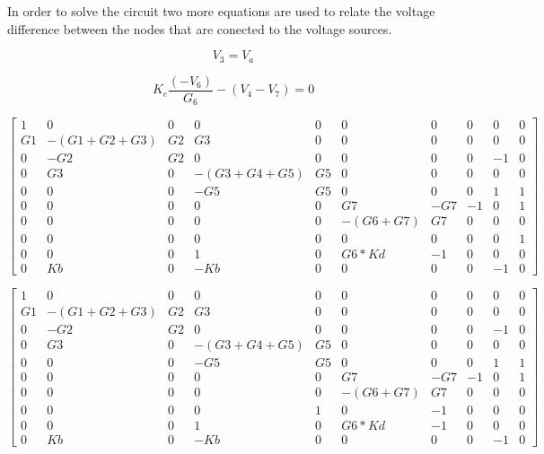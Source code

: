In order to solve the circuit two more equations are used to relate the voltage difference between the nodes that 
are conected to the voltage sources.

\begin{equation}
	V_3 = V_a
	\label{}
\end{equation}

\begin{equation}
	K_c\frac{(-V_6)}{G_6}-(V_4-V_7)=0
	\label{}
\end{equation}

$ \begin{bmatrix}
1 & 0 & 0 & 0 & 0 & 0 & 0 & 0 & 0 & 0 \\
G1 & -(G1+G2+G3) & G2 & G3 & 0 & 0 & 0 & 0 & 0 & 0 \\
0 & -G2 & G2 & 0 & 0 & 0 & 0 & 0 & -1 & 0 \\
0 & G3 & 0 & -(G3+G4+G5) & G5 & 0 & 0 & 0 & 0 & 0 \\
0 & 0 & 0 & -G5 & G5 & 0 & 0 & 0 & 1 & 1 \\
0 & 0 & 0 & 0 & 0 & G7 & -G7 & -1 & 0 & 1 \\
0 & 0 & 0 & 0 & 0 & -(G6+G7) & G7 & 0 & 0 & 0 \\
0 & 0 & 0 & 0 & 0 & 0 & 0 & 0 & 0 & 1 \\
0 & 0 & 0 & 1 & 0 & G6*Kd & -1 & 0 & 0 & 0 \\
0 & Kb & 0 & -Kb & 0 & 0 & 0 & 0 & -1 & 0 
\end{bmatrix}  $

$ \begin{bmatrix}
1 & 0 & 0 & 0 & 0 & 0 & 0 & 0 & 0 & 0 \\
G1 & -(G1+G2+G3) & G2 & G3 & 0 & 0 & 0 & 0 & 0 & 0 \\
0 & -G2 & G2 & 0 & 0 & 0 & 0 & 0 & -1 & 0 \\
0 & G3 & 0 & -(G3+G4+G5) & G5 & 0 & 0 & 0 & 0 & 0 \\
0 & 0 & 0 & -G5 & G5 & 0 & 0 & 0 & 1 & 1 \\
0 & 0 & 0 & 0 & 0 & G7 & -G7 & -1 & 0 & 1 \\
0 & 0 & 0 & 0 & 0 & -(G6+G7) & G7 & 0 & 0 & 0 \\
0 & 0 & 0 & 0 & 1 & 0 & -1 & 0 & 0 & 0 \\
0 & 0 & 0 & 1 & 0 & G6*Kd & -1 & 0 & 0 & 0 \\
0 & Kb & 0 & -Kb & 0 & 0 & 0 & 0 & -1 & 0 
\end{bmatrix}  $


